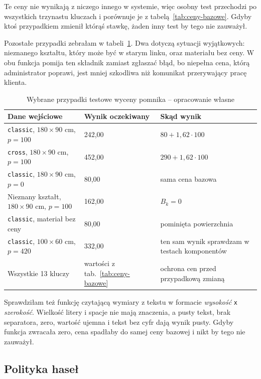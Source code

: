Te ceny nie wynikają z niczego innego w systemie, więc osobny test przechodzi po wszystkich trzynastu kluczach i porównuje je z tabelą~\ref{tab:ceny-bazowe}. Gdyby ktoś przypadkiem zmienił którąś stawkę, żaden inny test by tego nie zauważył.

Pozostałe przypadki zebrałam w tabeli~\ref{tab:przypadki-wyceny}. Dwa dotyczą sytuacji wyjątkowych: nieznanego kształtu, który może być w starym linku, oraz materiału bez ceny. W obu funkcja pomija ten składnik zamiast zgłaszać błąd, bo niepełna cena, którą administrator poprawi, jest mniej szkodliwa niż komunikat przerywający pracę klienta.

\begin{table}[htbp]
\centering
\caption{Wybrane przypadki testowe wyceny pomnika -- opracowanie własne}
\label{tab:przypadki-wyceny}
\begin{tabular}{|p{}|p{}|p{}|}
\hline
\textbf{Dane wejściowe} & \textbf{Wynik oczekiwany} & \textbf{Skąd wynik} \\
\hline
\texttt{classic}, $180 \times 90$ cm, $p = 100$ & 242,00 & $80 + 1{,}62 \cdot 100$ \\
\hline
\texttt{cross}, $180 \times 90$ cm, $p = 100$ & 452,00 & $290 + 1{,}62 \cdot 100$ \\
\hline
\texttt{classic}, $180 \times 90$ cm, $p = 0$ & 80,00 & sama cena bazowa \\
\hline
Nieznany kształt, $180 \times 90$ cm, $p = 100$ & 162,00 & $B_k = 0$ \\
\hline
\texttt{classic}, materiał bez ceny & 80,00 & pominięta powierzchnia \\
\hline
\texttt{classic}, $100 \times 60$ cm, $p = 420$ & 332,00 & ten sam wynik sprawdzam w testach komponentów \\
\hline
Wszystkie 13 kluczy & wartości z tab.~\ref{tab:ceny-bazowe} & ochrona cen przed przypadkową zmianą \\
\hline
\end{tabular}
\end{table}

Sprawdziłam też funkcję czytającą wymiary z tekstu w formacie \textit{wysokość} \texttt{x} \textit{szerokość}. Wielkość litery i spacje nie mają znaczenia, a pusty tekst, brak separatora, zero, wartość ujemna i tekst bez cyfr dają wynik pusty. Gdyby funkcja zwracała zero, cena spadłaby do samej ceny bazowej i nikt by tego nie zauważył.

\subsection{Polityka haseł}
\label{ssec:polityka-hasel}

